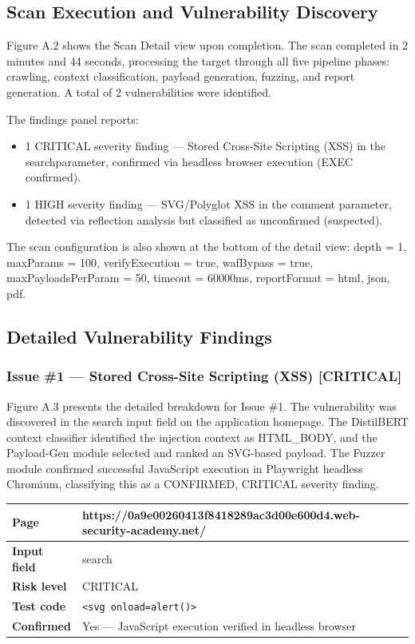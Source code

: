 \subsection{Scan Execution and Vulnerability Discovery}
Figure A.2 shows the Scan Detail view upon completion. The scan completed in 2 minutes
and 44 seconds, processing the target through all five pipeline phases: crawling, context
classification, payload generation, fuzzing, and report generation. A total of 2
vulnerabilities were identified.


The findings panel reports:
\begin{itemize}
    \item 1 CRITICAL severity finding — Stored Cross-Site Scripting (XSS) in the searchparameter, confirmed via headless browser execution (EXEC confirmed).
    \item 1 HIGH severity finding — SVG/Polyglot XSS in the comment parameter, detected via reflection analysis but classified as unconfirmed (suspected).
\end{itemize}

 
 
The scan configuration is also shown at the bottom of the detail view: depth = 1, maxParams = 100, verifyExecution = true, wafBypass = true, maxPayloadsPerParam = 50, timeout = 60000ms, reportFormat = html, json, pdf.

\subsection{Detailed Vulnerability Findings}
\subsubsection{ Issue \#1 — Stored Cross-Site Scripting (XSS) [CRITICAL]}
Figure A.3 presents the detailed breakdown for Issue \#1. The vulnerability was discovered
in the search input field on the application homepage. The DistilBERT context classifier
identified the injection context as HTML\_BODY, and the Payload-Gen module selected
and ranked an SVG-based payload. The Fuzzer module confirmed successful JavaScript
execution in Playwright headless Chromium, classifying this as a CONFIRMED,
CRITICAL severity finding.

\begin{table}[h]
\centering
\begin{tabular}{|l|p{10cm}|}
\hline
\textbf{Page} & https://0a9e00260413f8418289ac3d00e600d4.web-security-academy.net/ \\ \hline
\textbf{Input field} & search \\ \hline
\textbf{Risk level} & CRITICAL \\ \hline
\textbf{Test code} & \texttt{<svg onload=alert()>} \\ \hline
\textbf{Confirmed} & Yes — JavaScript execution verified in headless browser \\ \hline
\end{tabular}
\end{table}


